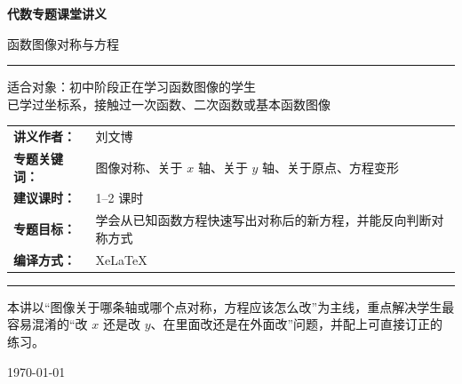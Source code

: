 \documentclass[11pt,a4paper,fontset=fandol]{ctexart}
\theoremstyle{formaltheorem}
\theoremstyle{formalexample}
\begin{document}
\thispagestyle{empty}
\begin{titlepage}
\centering
\vspace*{0.9cm}

\begin{tcolorbox}[
  enhanced,
  width=0.92\textwidth,
  colback=white,
  colframe=mainblue,
  boxrule=1pt,
  arc=0mm,
  left=6mm,
  right=6mm,
  top=8mm,
  bottom=8mm
]
\centering

{\fontsize{24}{30}\selectfont\bfseries 代数专题课堂讲义\par}
\vspace{0.7cm}
{\fontsize{17}{22}\selectfont 函数图像对称与方程\par}

\vspace{1.1cm}
\color{rulegray}\rule{0.72\textwidth}{0.7pt}\par
\vspace{1cm}

\begin{tcolorbox}[colback=lightblue,colframe=mainblue,width=0.82\textwidth,boxrule=1pt]
\centering
{\Large 适合对象：初中阶段正在学习函数图像的学生}\\[0.4em]
{\large 已学过坐标系，接触过一次函数、二次函数或基本函数图像}
\end{tcolorbox}

\vspace{1.2cm}

\renewcommand{\arraystretch}{1.42}
\begin{tabular}{>{\bfseries}p{3.5cm}p{8cm}}
讲义作者： & 刘文博 \\
专题关键词： & 图像对称、关于 $x$ 轴、关于 $y$ 轴、关于原点、方程变形 \\
建议课时： & 1--2 课时 \\
专题目标： & 学会从已知函数方程快速写出对称后的新方程，并能反向判断对称方式 \\
编译方式： & XeLaTeX \\
\end{tabular}

\vspace{1.2cm}
\color{rulegray}\rule{0.72\textwidth}{0.7pt}\par
\vspace{0.8cm}

{\normalsize 本讲以“图像关于哪条轴或哪个点对称，方程应该怎么改”为主线，重点解决学生最容易混淆的“改 $x$ 还是改 $y$、在里面改还是在外面改”问题，并配上可直接订正的练习。\par}

\vspace{0.5cm}
{\large \today\par}
\end{tcolorbox}
\end{titlepage}
\end{document}
